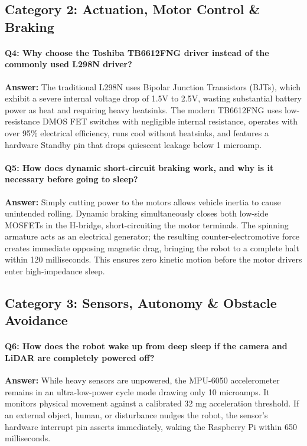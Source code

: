 \documentclass[11pt,a4paper]{article}
\begin{document}
\subsection{Category 2: Actuation, Motor Control \& Braking}

\paragraph{Q4: Why choose the Toshiba TB6612FNG driver instead of the commonly used L298N driver?}
\textbf{Answer:} The traditional L298N uses Bipolar Junction Transistors (BJTs), which exhibit a severe internal voltage drop of 1.5V to 2.5V, wasting substantial battery power as heat and requiring heavy heatsinks. The modern TB6612FNG uses low-resistance DMOS FET switches with negligible internal resistance, operates with over 95\% electrical efficiency, runs cool without heatsinks, and features a hardware Standby pin that drops quiescent leakage below 1 microamp.

\paragraph{Q5: How does dynamic short-circuit braking work, and why is it necessary before going to sleep?}
\textbf{Answer:} Simply cutting power to the motors allows vehicle inertia to cause unintended rolling. Dynamic braking simultaneously closes both low-side MOSFETs in the H-bridge, short-circuiting the motor terminals. The spinning armature acts as an electrical generator; the resulting counter-electromotive force creates immediate opposing magnetic drag, bringing the robot to a complete halt within 120 milliseconds. This ensures zero kinetic motion before the motor drivers enter high-impedance sleep.

\subsection{Category 3: Sensors, Autonomy \& Obstacle Avoidance}

\paragraph{Q6: How does the robot wake up from deep sleep if the camera and LiDAR are completely powered off?}
\textbf{Answer:} While heavy sensors are unpowered, the MPU-6050 accelerometer remains in an ultra-low-power cycle mode drawing only 10 microamps. It monitors physical movement against a calibrated 32 mg acceleration threshold. If an external object, human, or disturbance nudges the robot, the sensor’s hardware interrupt pin asserts immediately, waking the Raspberry Pi within 650 milliseconds.
\end{document}
